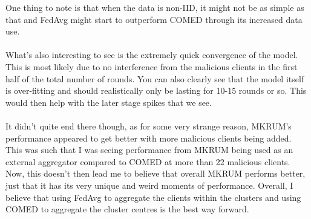 One thing to note is that when the data is non-IID, it might not be as simple as that and FedAvg might start to outperform COMED through its increased data use.
\\ \\
What's also interesting to see is the extremely quick convergence of the model.
This is most likely due to no interference from the malicious clients in the first half of the total number of rounds.
You can also clearly see that the model itself is over-fitting and should realistically only be lasting for 10-15 rounds or so.
This would then help with the later stage spikes that we see.
\\ \\
It didn't quite end there though, as for some very strange reason, MKRUM's performance appeared to get better with more malicious clients being added.
This was such that I was seeing performance from MKRUM being used as an external aggregator compared to COMED at more than 22 malicious clients.
Now, this doesn't then lead me to believe that overall MKRUM performs better, just that it has its very unique and weird moments of performance.
Overall, I believe that using FedAvg to aggregate the clients within the clusters and using COMED to aggregate the cluster centres is the best way forward.


